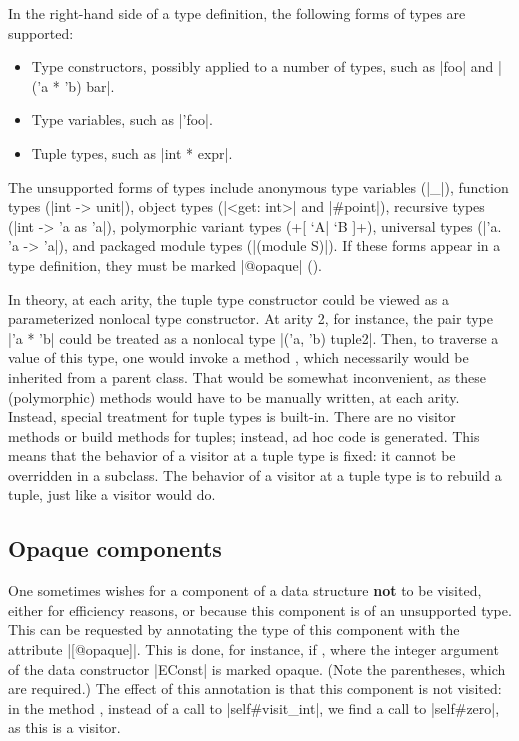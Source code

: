 \documentclass[11pt,a4paper,twoside]{article}
\renewcommand{\emph}[1]{\textbf{#1}}
\begin{document}
In the right-hand side of a type definition, the following forms of types are
supported:
\begin{itemize}
\item Type constructors, possibly applied to a number of types, such as
  \oc|foo| and \oc|('a * 'b) bar|.
\item Type variables, such as \oc|'foo|.
\item Tuple types, such as \oc|int * expr|.
\end{itemize}
The unsupported forms of types include
anonymous type variables (\oc|_|),
function types (\oc|int -> unit|),
object types (\oc|<get: int>| and \oc|#point|),
recursive types (\oc|int -> 'a as 'a|),
polymorphic variant types (\oc+[ `A| `B ]+),
universal types (\oc|'a. 'a -> 'a|),
and
packaged module types (\oc|(module S)|).
If these forms appear in a type definition,
they must be marked \oc|@opaque| ().

In theory, at each arity, the tuple type constructor could be viewed as a
parameterized nonlocal type constructor. At arity 2, for instance, the pair
type \oc|'a * 'b| could be treated as a nonlocal type \oc|('a, 'b) tuple2|.
Then, to traverse a value of this type, one would invoke a method
, which necessarily would be inherited from a parent
class. That would be somewhat inconvenient, as these (polymorphic) methods
would have to be manually written, at each arity. Instead, special treatment
for tuple types is built-in. There are no visitor methods or build methods for
tuples; instead, ad hoc code is generated. This means that the behavior of a
visitor at a tuple type is fixed: it cannot be overridden in a subclass. The
behavior of a \fold visitor at a tuple type is to rebuild a tuple, just like a
\map visitor would do.


\subsection{Opaque components}
\label{sec:opaque}

One sometimes wishes for a component of a data structure \emph{not} to be
visited, either for efficiency reasons, or because this component is of an
unsupported type. This can be requested by annotating the type of this
component with the attribute \oc|[@opaque]|. This is done, for instance, if
, where the integer argument of the data constructor
\oc|EConst| is marked opaque. (Note the parentheses, which are required.) The
effect of this annotation is that this component is not visited: in the method
, instead of a call to \oc|self#visit_int|, we find a
call to \oc|self#zero|, as this is a \reduce visitor.
\end{document}
